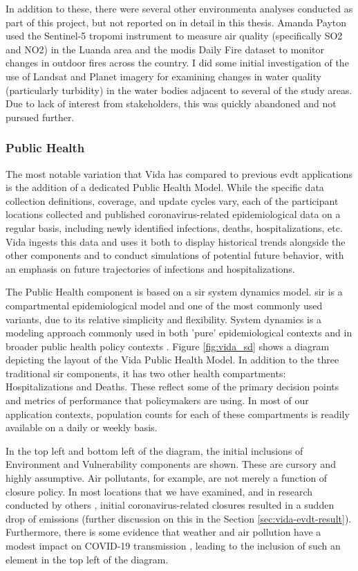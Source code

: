 In addition to these, there were several other environmenta analyses conducted as part of this project, but not reported on in detail in this thesis. Amanda Payton used the Sentinel-5 \ac{tropomi} instrument to measure air quality (specifically SO2 and NO2) in the Luanda area and the \ac{modis} Daily Fire dataset to monitor changes in outdoor fires across the country. I did some initial investigation of the use of Landsat and Planet imagery for examining changes in water quality (particularly turbidity) in the water bodies adjacent to several of the study areas. Due to lack of interest from stakeholders, this was quickly abandoned and not pursued further.

\subsubsection{Public Health} \label{sec:vida-evdt-method-p}

The most notable variation that Vida has compared to previous \ac{evdt} applications is the addition of a dedicated Public Health Model. While the specific data collection definitions, coverage, and update cycles vary, each of the participant locations collected and published coronavirus-related epidemiological data on a regular basis, including newly identified infections, deaths, hospitalizations, etc. Vida ingests this data and uses it both to display historical trends alongside the other components and to conduct simulations of potential future behavior, with an emphasis on future trajectories of infections and hospitalizations. 

The Public Health component is based on a \ac{sir} system dynamics model. \ac{sir} is a compartmental epidemiological model and one of the most commonly used variants, due to its relative simplicity and flexibility. System dynamics is a modeling approach commonly used in both 'pure' epidemiological contexts \cite{homerSystemDynamicsModeling2006} and in broader public health policy contexts \cite{deutschCommunitybasedSystemDynamics2020}. Figure \ref{fig:vida_sd} shows a diagram depicting the layout of the Vida Public Health Model. In addition to the three traditional \ac{sir} components, it has two other health compartments: Hospitalizations and Deaths. These reflect some of the primary decision points and metrics of performance that policymakers are using. In most of our application contexts, population counts for each of these compartments is readily available on a daily or weekly basis. 

In the top left and bottom left of the diagram, the initial inclusions of Environment and Vulnerability components are shown. These are cursory and highly assumptive. Air pollutants, for example, are not merely a function of closure policy. In most locations that we have examined, and in research conducted by others \cite{isaifanDramaticImpactCoronavirus2020}, initial coronavirus-related closures resulted in a sudden drop of emissions (further discussion on this in the Section \ref{sec:vida-evdt-result}). Furthermore, there is some evidence that weather and air pollution have a modest impact on COVID-19 transmission \cite{xuModestImpactWeather2020}, leading to the inclusion of such an element in the top left of the diagram.

